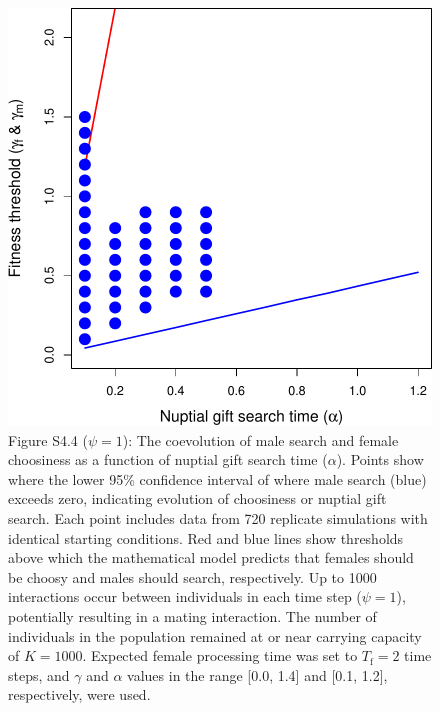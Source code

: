 \documentclass[
]{article}
\begin{document}
\captionsetup{labelformat=default}

\clearpage

\captionsetup{labelformat=empty}

\begin{figure}
\centering
\includegraphics{ms_refs_fixed_files/figure-latex/unnamed-chunk-9-1.pdf}
\caption{Figure S4.4 (\(\psi = 1\)): The coevolution of male search and
female choosiness as a function of nuptial gift search time
(\(\alpha\)). Points show where the lower 95\% confidence interval of
where male search (blue) exceeds zero, indicating evolution of
choosiness or nuptial gift search. Each point includes data from 720
replicate simulations with identical starting conditions. Red and blue
lines show thresholds above which the mathematical model predicts that
females should be choosy and males should search, respectively. Up to
1000 interactions occur between individuals in each time step
(\(\psi = 1\)), potentially resulting in a mating interaction. The
number of individuals in the population remained at or near carrying
capacity of \(K = 1000\). Expected female processing time was set to
\(T_{\mathrm{f}}=2\) time steps, and \(\gamma\) and \(\alpha\) values in
the range {[}0.0, 1.4{]} and {[}0.1, 1.2{]}, respectively, were used.}
\end{figure}

\captionsetup{labelformat=default}
\end{document}

